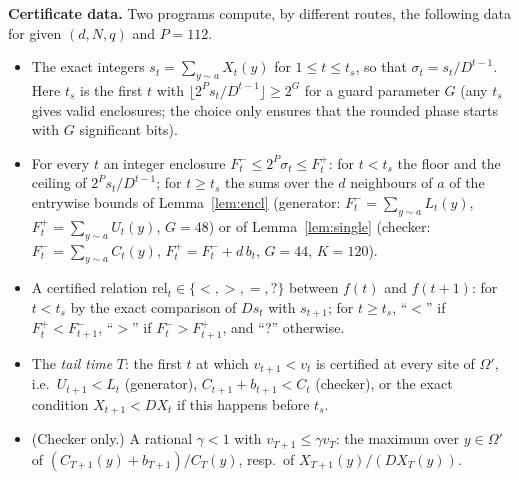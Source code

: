 \documentclass[11pt,a4paper]{article}
\theoremstyle{definition}
\theoremstyle{remark}
\begin{document}
\textbf{Certificate data.} Two programs compute, by different routes, the following data for given $(d,N,q)$ and $P=112$.
\begin{itemize}
\item The exact integers $s_t=\sum_{y\sim a}X_t(y)$ for $1\le t\le t_s$, so that $\sigma_t=s_t/D^{t-1}$. Here $t_s$ is the first $t$ with $\lfloor 2^Ps_t/D^{t-1}\rfloor\ge2^G$ for a guard parameter $G$ (any $t_s$ gives valid enclosures; the choice only ensures that the rounded phase starts with $G$ significant bits).
\item For every $t$ an integer enclosure $F^-_t\le2^P\sigma_t\le F^+_t$: for $t<t_s$ the floor and the ceiling of $2^Ps_t/D^{t-1}$; for $t\ge t_s$ the sums over the $d$ neighbours of $a$ of the entrywise bounds of Lemma~\ref{lem:encl} (generator: $F^-_t=\sum_{y\sim a}L_t(y)$, $F^+_t=\sum_{y\sim a}U_t(y)$, $G=48$) or of Lemma~\ref{lem:single} (checker: $F^-_t=\sum_{y\sim a}C_t(y)$, $F^+_t=F^-_t+d\,b_t$, $G=44$, $K=120$).
\item A certified relation $\mathrm{rel}_t\in\{<,>,=,?\}$ between $f(t)$ and $f(t+1)$: for $t<t_s$ by the exact comparison of $Ds_t$ with $s_{t+1}$; for $t\ge t_s$, ``$<$'' if $F^+_t<F^-_{t+1}$, ``$>$'' if $F^-_t>F^+_{t+1}$, and ``?'' otherwise.
\item The \emph{tail time} $T$: the first $t$ at which $v_{t+1}<v_t$ is certified at every site of $\Omega'$, i.e.\ $U_{t+1}<L_t$ (generator), $C_{t+1}+b_{t+1}<C_t$ (checker), or the exact condition $X_{t+1}<DX_t$ if this happens before $t_s$.
\item (Checker only.) A rational $\gamma<1$ with $v_{T+1}\le\gamma v_T$: the maximum over $y\in\Omega'$ of $(C_{T+1}(y)+b_{T+1})/C_T(y)$, resp.\ of $X_{T+1}(y)/(DX_T(y))$.
\end{itemize}
\end{document}
